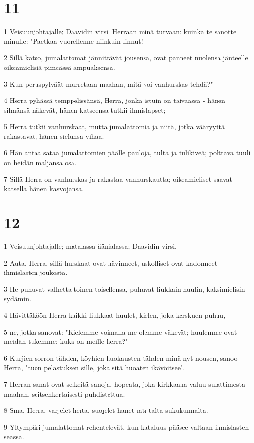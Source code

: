 \chapter{11}

\par 1 Veisuunjohtajalle; Daavidin virsi. Herraan minä turvaan; kuinka te sanotte minulle: "Paetkaa vuorellenne niinkuin linnut!
\par 2 Sillä katso, jumalattomat jännittävät jousensa, ovat panneet nuolensa jänteelle oikeamielisiä pimeässä ampuaksensa.
\par 3 Kun peruspylväät murretaan maahan, mitä voi vanhurskas tehdä?"
\par 4 Herra pyhässä temppelissänsä, Herra, jonka istuin on taivaassa - hänen silmänsä näkevät, hänen katseensa tutkii ihmislapset;
\par 5 Herra tutkii vanhurskaat, mutta jumalattomia ja niitä, jotka vääryyttä rakastavat, hänen sielunsa vihaa.
\par 6 Hän antaa sataa jumalattomien päälle pauloja, tulta ja tulikiveä; polttava tuuli on heidän maljansa osa.
\par 7 Sillä Herra on vanhurskas ja rakastaa vanhurskautta; oikeamieliset saavat katsella hänen kasvojansa.

\chapter{12}

\par 1 Veisuunjohtajalle; matalassa äänialassa; Daavidin virsi.
\par 2 Auta, Herra, sillä hurskaat ovat hävinneet, uskolliset ovat kadonneet ihmislasten joukosta.
\par 3 He puhuvat valhetta toinen toisellensa, puhuvat liukkain huulin, kaksimielisin sydämin.
\par 4 Hävittäköön Herra kaikki liukkaat huulet, kielen, joka kerskuen puhuu,
\par 5 ne, jotka sanovat: "Kielemme voimalla me olemme väkevät; huulemme ovat meidän tukemme; kuka on meille herra?"
\par 6 Kurjien sorron tähden, köyhien huokausten tähden minä nyt nousen, sanoo Herra, "tuon pelastuksen sille, joka sitä huoaten ikävöitsee".
\par 7 Herran sanat ovat selkeitä sanoja, hopeata, joka kirkkaana valuu sulattimesta maahan, seitsenkertaisesti puhdistettua.
\par 8 Sinä, Herra, varjelet heitä, suojelet hänet iäti tältä sukukunnalta.
\par 9 Yltympäri jumalattomat rehentelevät, kun kataluus pääsee valtaan ihmislasten seassa.

